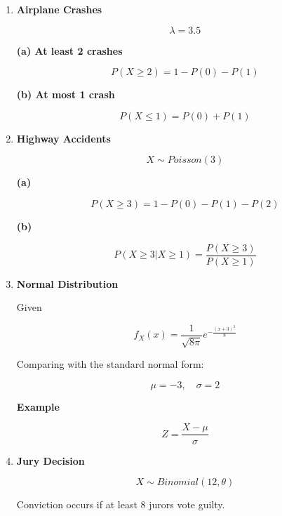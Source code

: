 \documentclass[11pt]{article}
\begin{document}
\begin{enumerate}[label=\textbf{Question \arabic*:}]
\[
\lambda = 0.2
\]

\textbf{(a) Probability of 0 errors}

\[
P(X=0)=e^{-0.2}
\]

\[
P(X=0)\approx0.8187
\]

\textbf{(b) Probability of at least 2 errors}

\[
P(X\ge2)=1-P(0)-P(1)
\]

\[
P(1)=0.2e^{-0.2}
\]

\newpage

\item \textbf{Airplane Crashes}

\[
\lambda =3.5
\]

\textbf{(a) At least 2 crashes}

\[
P(X\ge2)=1-P(0)-P(1)
\]

\textbf{(b) At most 1 crash}

\[
P(X\le1)=P(0)+P(1)
\]

\newpage

\item \textbf{Highway Accidents}

\[
X\sim Poisson(3)
\]

\textbf{(a)}

\[
P(X\ge3)=1-P(0)-P(1)-P(2)
\]

\textbf{(b)}

\[
P(X\ge3|X\ge1)=\frac{P(X\ge3)}{P(X\ge1)}
\]

\newpage

\item \textbf{Normal Distribution}

Given

\[
f_X(x)=\frac{1}{\sqrt{8\pi}} e^{-\frac{(x+3)^2}{8}}
\]

Comparing with the standard normal form:

\[
\mu=-3,\quad \sigma=2
\]

\textbf{Example}

\[
Z=\frac{X-\mu}{\sigma}
\]

\newpage

\item \textbf{Jury Decision}

\[
X\sim Binomial(12,\theta)
\]

Conviction occurs if at least 8 jurors vote guilty.


\end{enumerate}
\end{document}
